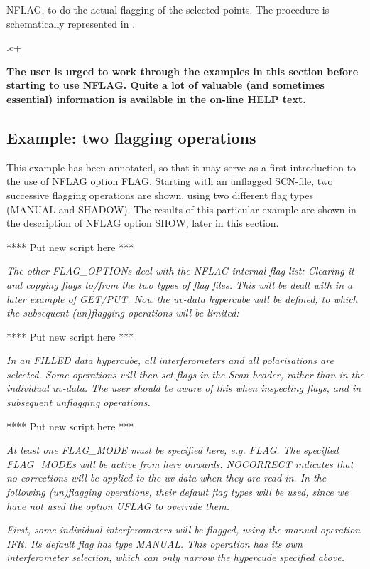 \item   NFLAG, to do the actual flagging of the selected points.
\ei
The procedure is schematically represented in .


.c+

{\bf The user is urged to work through the examples in this section before
starting to use NFLAG. Quite a lot of valuable (and sometimes essential)
information is available in the on-line HELP text.}



\newpage
\subsection{Example: two flagging operations}
\label{.example1}

	This example has been annotated, so that it may serve as a first
introduction to the use of NFLAG option FLAG. Starting with an unflagged
SCN-file, two successive flagging operations are shown, using two different
flag types (MANUAL and SHADOW). The results of this particular example
are shown in the description of NFLAG option SHOW, later in this section.


**** Put new script here ***


{\it  The other FLAG\_OPTIONs deal with the NFLAG internal flag list:
Clearing it and copying flags to/from the two types of flag files.
This will be dealt with in a later example of GET/PUT.
Now the uv-data hypercube will be defined, to which the subsequent
(un)flagging operations will be limited:}


**** Put new script here ***


{\it In an FILLED data hypercube, all interferometers and all polarisations are
selected. Some operations will then set flags in the Scan header, rather than
in the individual uv-data. The user should be aware of this when inspecting
flags, and in subsequent unflagging operations.}


**** Put new script here ***


{\it At least one FLAG\_MODE must be specified here, e.g. FLAG.
The specified FLAG\_MODEs will be active from here onwards.
NOCORRECT indicates that no corrections will be applied to the uv-data when
they are read in.
In the following (un)flagging operations, their default flag types will be
used, since we have not used the option UFLAG to override them.}


{\it  First, some individual interferometers will be flagged, using the manual
operation IFR. Its default flag has type MANUAL. This operation has its own
interferometer selection, which can only {\em narrow} the hypercude specified
above.}


